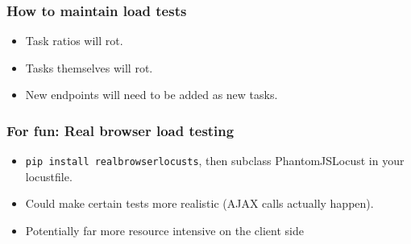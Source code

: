 \documentclass{beamer}
\begin{document}
\begin{frame}
\frametitle{How to maintain load tests}
\begin{itemize}
\item Task ratios will rot.\pause
\item Tasks themselves will rot.\pause
\item New endpoints will need to be added as new tasks.
\end{itemize}
\end{frame}


\begin{frame}
\frametitle{For fun: Real browser load testing}
\begin{itemize}
\item \texttt{pip install realbrowserlocusts}, then subclass PhantomJSLocust in
      your locustfile.
\item Could make certain tests more realistic (AJAX calls actually happen).
\item Potentially far more resource intensive on the client side
\end{itemize}
\end{frame}
\end{document}
